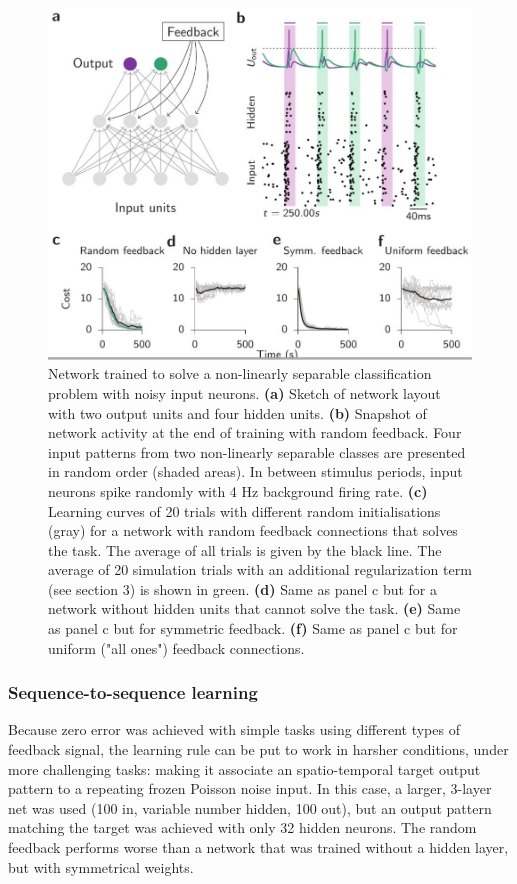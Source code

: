 \documentclass[main]{subfiles}
\begin{document}
\begin{figure}[H]
    \centering
    \includegraphics[width=0.8\linewidth]{10_DeepLearningWithSpikes/figures/feedbackalignment.png}
    \caption{Network trained to solve a non-linearly separable classification problem with noisy input neurons. \textbf{(a)} Sketch of network layout with two output units and four hidden units. \textbf{(b)} Snapshot of network activity at the end of training with random feedback. Four input patterns from two non-linearly separable classes are presented in random order (shaded areas). In between stimulus periods, input neurons spike randomly with 4 Hz background firing rate. \textbf{(c)} Learning curves of 20 trials with different random initialisations (gray) for a network with random feedback connections that solves the task. The average of all trials is given by the black line. The average of 20 simulation trials with an additional regularization term (see section 3) is shown in green. \textbf{(d)} Same as panel c but for a network without hidden units that cannot solve the task. \textbf{(e)} Same as panel c but for symmetric feedback. \textbf{(f)} Same as panel c but for uniform ("all ones") feedback connections.}
    \label{fig:my_label}
\end{figure}


\subsubsection{Sequence-to-sequence learning}
Because zero error was achieved with simple tasks using different types of feedback signal, the learning rule can be put to work in harsher conditions, under more challenging tasks: making it associate an spatio-temporal target output pattern to a repeating frozen Poisson noise input. In this case, a larger, 3-layer net was used (100 in, variable number hidden, 100 out), but an output pattern matching the target was achieved with only 32 hidden neurons. The random feedback performs worse than a network that was trained without a hidden layer, but with symmetrical weights.
\end{document}
